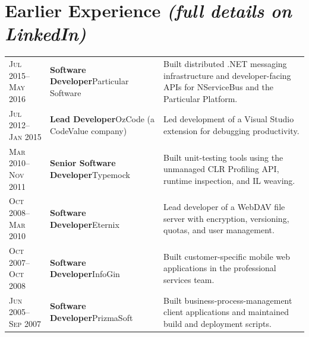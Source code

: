 \documentclass[a4paper,11pt]{article}
\begin{document}
\newpage
\begingroup
\titlespacing{\section}{0pt}{1.4em}{6pt}
\section{Earlier Experience \hfill{\normalfont\footnotesize\itshape (full details on LinkedIn)}}
\begin{longtable}{@{}p{}|p{}|p{}@{}}
  \textsc{Jul 2015--May 2016} & \textbf{Software Developer}\newline Particular Software
    &Built distributed .NET messaging infrastructure and developer-facing APIs for NServiceBus and the Particular Platform.
    \par\vspace{8pt} \\
  \textsc{Jul 2012--Jan 2015} & \textbf{Lead Developer}\newline OzCode (a CodeValue company)
    &Led development of a Visual Studio extension for debugging productivity.
    \par\vspace{8pt} \\
  \textsc{Mar 2010--Nov 2011} & \textbf{Senior Software Developer}\newline Typemock
    &Built unit-testing tools using the unmanaged CLR Profiling API, runtime inspection, and IL weaving.
    \par\vspace{8pt} \\
  \textsc{Oct 2008--Mar 2010} & \textbf{Software Developer}\newline Eternix
    &Lead developer of a WebDAV file server with encryption, versioning, quotas, and user management.
    \par\vspace{8pt} \\
  \textsc{Oct 2007--Oct 2008} & \textbf{Software Developer}\newline InfoGin
    &Built customer-specific mobile web applications in the professional services team.
    \par\vspace{8pt} \\
  \textsc{Jun 2005--Sep 2007} & \textbf{Software Developer}\newline PrizmaSoft
    &Built business-process-management client applications and maintained build and deployment scripts.
    \par\vspace{5pt}
\end{longtable}
\end{document}
